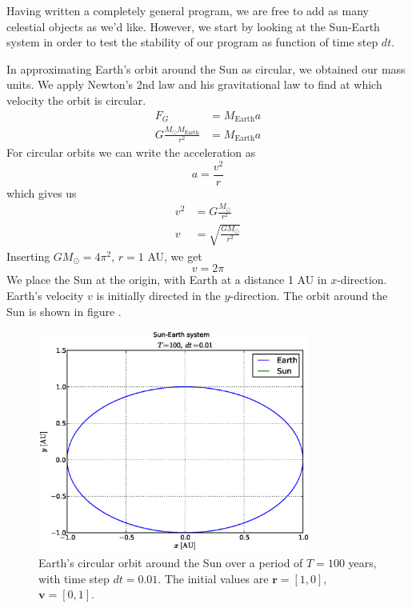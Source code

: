 
Having written a completely general program, we are free to add as many
celestial objects as we'd like. However, we start by looking at the Sun-Earth
system in order to test the stability of our program as function of time step
$dt$.

In approximating Earth's orbit around the Sun as circular, we obtained our
mass units. We apply Newton's 2nd law and his gravitational law to find at which
velocity the orbit is circular.
%
\begin{align*}
	F_G &= M_{\text{Earth}}a \\
	G \frac{M_{\odot}M_{\text{Earth}}}{r^2} &= M_{\text{Earth}}a
\end{align*}
%
For circular orbits we can write the acceleration as
%
\begin{equation*}
	a = \frac{v^2}{r}
\end{equation*}
which gives us
%
\begin{align*}
	v^2 &= G \frac{M_{\odot}}{r^2} \\
	v &= \sqrt{ \frac{GM_{\odot}}{r^2}}
\end{align*}
%
Inserting $GM_{\odot} = 4\pi^2$, $r = 1$ AU, we get
%
\begin{equation*}
	v = 2\pi
\end{equation*}
%
We place the Sun at the origin, with Earth at a distance 1 AU in $x$-direction.
Earth's velocity $v$ is initially directed in the $y$-direction. The orbit
around the Sun is shown in figure .
%
\begin{figure}[htpb]
	\centering
	\includegraphics[width=0.8\textwidth]{figures/sun_earth_T100_dt1e-2}
	\caption{Earth's circular orbit around the Sun over a period of $T = 100$
	 years, with time step $dt = 0.01$. The initial values are 
	 $\mathbf{r} = [1,0]$, $\mathbf{v} = [0,1]$.}
	\label{fig:sunEarth-dt0.01}
\end{figure}
